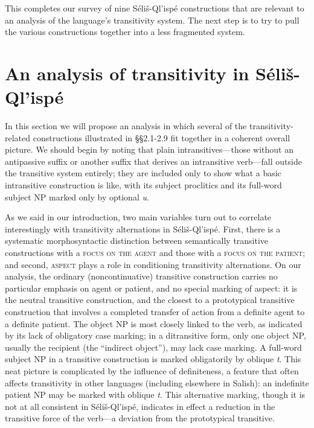 \documentclass[output=paper,colorlinks,citecolor=brown]{langscibook}
\begin{document}
\bigskip

This completes our survey of nine S\'eli\v{s}-Ql'isp\'e constructions
that are relevant to an analysis of the language's transitivity
system.  The next step is to try to pull the various constructions
together into a less fragmented system.

\section{An analysis of transitivity in S\'eli\v{s}-Ql'isp\'e}  %

In this section we will propose an analysis in which several of the
transitivity-related constructions illustrated in \S\S 2.1-2.9 fit
together in a coherent overall picture.  We should begin by noting
that plain intransitives---those without an antipassive suffix or
another suffix that derives an intransitive verb---fall outside the
transitive system entirely; they are included only to show what a
basic intransitive construction is like, with its subject proclitics
and its full-word subject NP marked only by optional \emph{{\textltilde}u}.


As we said in our introduction, two main variables turn out to
correlate interestingly with transitivity alternations in
S\'eli\v{s}-Ql'isp\'e.  First, there is a systematic morphosyntactic
distinction between semantically transitive constructions with a
\textsc{focus on the agent} and those with a \textsc{focus on the
patient}; and second, \textsc{aspect} plays a role in conditioning
transitivity alternations.  On our analysis, the ordinary
(noncontinuative) transitive construction carries no particular
emphasis on agent or patient, and no special marking of aspect: it is
the neutral transitive construction, and the closest to a prototypical
transitive construction that involves a completed transfer of action
from a definite agent to a definite patient.  The object NP is most
closely linked to the verb, as indicated by its lack of obligatory
case marking; in a ditransitive form, only one object NP, usually the
recipient (the ``indirect object''), may lack case marking.  A
full-word subject NP in a transitive construction is marked
obligatorily by oblique \emph{t}.  This neat picture is complicated by
the influence of definiteness, a feature that often affects
transitivity in other languages (including elsewhere in Salish): an
indefinite patient NP may be marked with oblique \emph{t}.  This
alternative marking, though it is not at all consistent in
S\'eli\v{s}-Ql'isp\'e, indicates in effect a reduction in the
transitive force of the verb---a deviation from the prototypical
transitive.
\end{document}
